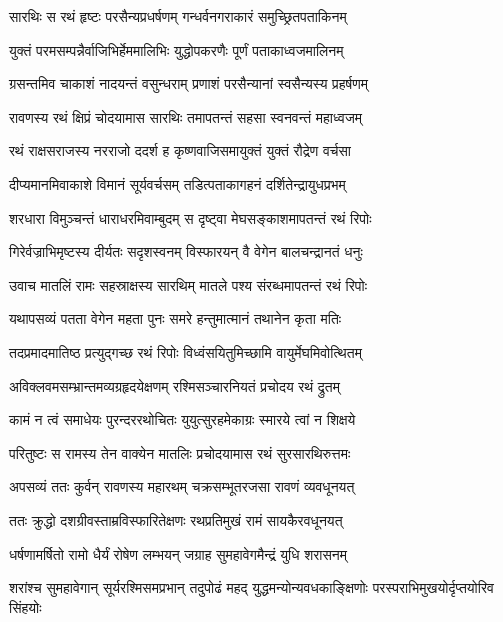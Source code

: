 
\twolineshloka
{सारथिः स रथं हृष्टः परसैन्यप्रधर्षणम्}
{गन्धर्वनगराकारं समुच्छ्रितपताकिनम्} %

\twolineshloka
{युक्तं परमसम्पन्नैर्वाजिभिर्हेममालिभिः}
{युद्धोपकरणैः पूर्णं पताकाध्वजमालिनम्} %

\twolineshloka
{ग्रसन्तमिव चाकाशं नादयन्तं वसुन्धराम्}
{प्रणाशं परसैन्यानां स्वसैन्यस्य प्रहर्षणम्} %

\twolineshloka
{रावणस्य रथं क्षिप्रं चोदयामास सारथिः}
{तमापतन्तं सहसा स्वनवन्तं महाध्वजम्} %

\twolineshloka
{रथं राक्षसराजस्य नरराजो ददर्श ह}
{कृष्णवाजिसमायुक्तं युक्तं रौद्रेण वर्चसा} %

\twolineshloka
{दीप्यमानमिवाकाशे विमानं सूर्यवर्चसम्}
{तडित्पताकागहनं दर्शितेन्द्रायुधप्रभम्} %

\twolineshloka
{शरधारा विमुञ्चन्तं धाराधरमिवाम्बुदम्}
{स दृष्ट्वा मेघसङ्काशमापतन्तं रथं रिपोः} %

\twolineshloka
{गिरेर्वज्राभिमृष्टस्य दीर्यतः सदृशस्वनम्}
{विस्फारयन् वै वेगेन बालचन्द्रानतं धनुः} %

\twolineshloka
{उवाच मातलिं रामः सहस्राक्षस्य सारथिम्}
{मातले पश्य संरब्धमापतन्तं रथं रिपोः} %

\twolineshloka
{यथापसव्यं पतता वेगेन महता पुनः}
{समरे हन्तुमात्मानं तथानेन कृता मतिः} %

\twolineshloka
{तदप्रमादमातिष्ठ प्रत्युद्गच्छ रथं रिपोः}
{विध्वंसयितुमिच्छामि वायुर्मेघमिवोत्थितम्} %

\twolineshloka
{अविक्लवमसम्भ्रान्तमव्यग्रहृदयेक्षणम्}
{रश्मिसञ्चारनियतं प्रचोदय रथं द्रुतम्} %

\twolineshloka
{कामं न त्वं समाधेयः पुरन्दररथोचितः}
{युयुत्सुरहमेकाग्रः स्मारये त्वां न शिक्षये} %

\twolineshloka
{परितुष्टः स रामस्य तेन वाक्येन मातलिः}
{प्रचोदयामास रथं सुरसारथिरुत्तमः} %

\twolineshloka
{अपसव्यं ततः कुर्वन् रावणस्य महारथम्}
{चक्रसम्भूतरजसा रावणं व्यवधूनयत्} %

\twolineshloka
{ततः क्रुद्धो दशग्रीवस्ताम्रविस्फारितेक्षणः}
{रथप्रतिमुखं रामं सायकैरवधूनयत्} %

\twolineshloka
{धर्षणामर्षितो रामो धैर्यं रोषेण लम्भयन्}
{जग्राह सुमहावेगमैन्द्रं युधि शरासनम्} %

\threelineshloka
{शरांश्च सुमहावेगान् सूर्यरश्मिसमप्रभान्}
{तदुपोढं महद् युद्धमन्योन्यवधकाङ्क्षिणोः}
{परस्पराभिमुखयोर्दृप्तयोरिव सिंहयोः} %

